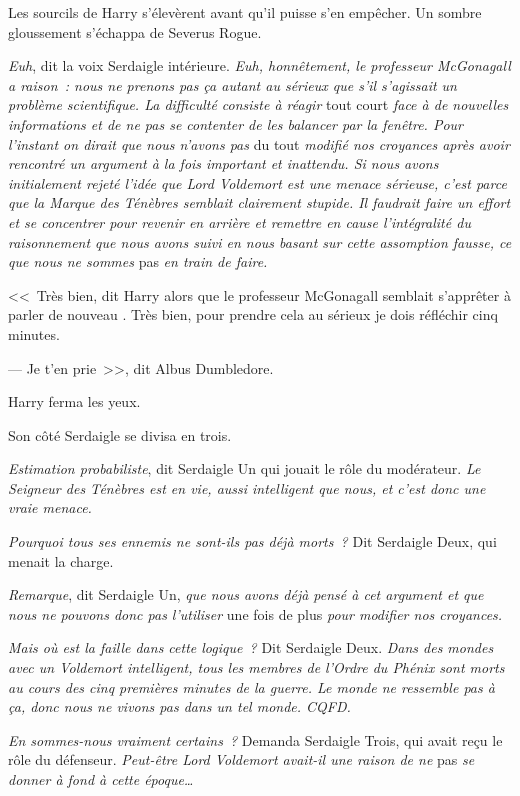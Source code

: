 Les sourcils de Harry s'élevèrent avant qu'il puisse s'en empêcher. Un sombre gloussement s'échappa de Severus Rogue.

\emph{Euh}, dit la voix Serdaigle intérieure. \emph{Euh, honnêtement, le professeur McGonagall a raison~: nous ne prenons pas ça autant au sérieux que s'il s'agissait un problème scientifique. La difficulté consiste à réagir} tout court \emph{face à de nouvelles informations et de ne pas se contenter de les balancer par la fenêtre. Pour l'instant on dirait que nous n'avons pas} du tout \emph{modifié nos croyances après avoir rencontré un argument à la fois important et inattendu. Si nous avons initialement rejeté l'idée que Lord Voldemort est une menace sérieuse, c'est parce que la Marque des Ténèbres semblait clairement stupide. Il faudrait faire un effort et se concentrer pour revenir en arrière et remettre en cause l'intégralité du raisonnement que nous avons suivi en nous basant sur cette assomption fausse, ce que nous ne sommes} pas \emph{en train de faire.}

<<~Très bien, dit Harry alors que le professeur McGonagall semblait s'apprêter à parler de nouveau . Très bien, pour prendre cela au sérieux je dois réfléchir cinq minutes.

--- Je t'en prie~>>, dit Albus Dumbledore.

Harry ferma les yeux.

Son côté Serdaigle se divisa en trois.

\emph{Estimation probabiliste}, dit Serdaigle Un qui jouait le rôle du modérateur. \emph{Le Seigneur des Ténèbres est en vie, aussi intelligent que nous, et c'est donc une vraie menace.}

\emph{Pourquoi tous ses ennemis ne sont-ils pas déjà morts~?} Dit Serdaigle Deux, qui menait la charge.

\emph{Remarque}, dit Serdaigle Un, \emph{que nous avons déjà pensé à cet argument et que nous ne pouvons donc pas l'utiliser} une fois de plus \emph{pour modifier nos croyances.}

\emph{Mais où est la faille dans cette logique~?} Dit Serdaigle Deux. \emph{Dans des mondes avec un Voldemort intelligent, tous les membres de l'Ordre du Phénix sont morts au cours des cinq premières minutes de la guerre. Le monde ne ressemble pas à ça, donc nous ne vivons pas dans un tel monde. CQFD.}

\emph{En sommes-nous vraiment certains~?} Demanda Serdaigle Trois, qui avait reçu le rôle du défenseur. \emph{Peut-être Lord Voldemort avait-il une raison de ne} pas \emph{se donner à fond à cette époque…}

